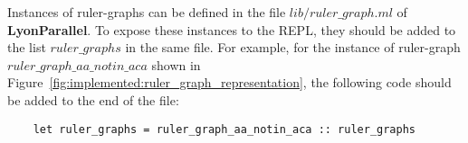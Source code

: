 Instances of ruler-graphs can be defined in the file \colorbox{Ivory2}{$lib/ruler\_graph.ml$} of \textbf{LyonParallel}. To expose these instances to the REPL, they should be added to the list \colorbox{Ivory2}{$ruler\_graphs$} in the same file. For example, for the instance of ruler-graph \colorbox{Ivory2}{$ruler\_graph\_aa\_notin\_aca$} shown in Figure~\ref{fig:implemented:ruler_graph_representation}, the following code should be added to the end of the file:
\begin{verbatim}
    let ruler_graphs = ruler_graph_aa_notin_aca :: ruler_graphs 
\end{verbatim}




